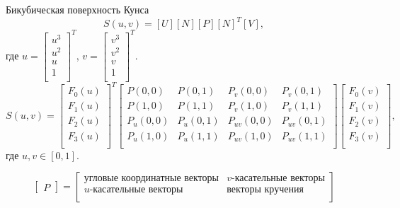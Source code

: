 \documentclass{beamer}
\begin{document}
	\begin{frame}{Бикубическая поверхность Кунса}
		\[
			S(u,v) = [U][N][P][N]^T[V]
			,
		\]
		где
		$ u =
		\begin{bmatrix}
			u^3 \\
			u^2 \\
			u \\
			1 \\
		\end{bmatrix}^T$,
		$ v =
		\begin{bmatrix}
			v^3 \\
			v^2 \\
			v \\
			1 \\
		\end{bmatrix}^T
		$.
		\[
			S(u,v) = 
			\begin{bmatrix}
				F_0(u) \\
				F_1(u) \\
				F_2(u) \\
				F_3(u) \\
			\end{bmatrix}^T
			\begin{bmatrix}
				P(0,0) & P(0,1) & P_v(0,0) & P_v(0,1) \\
				P(1,0) & P(1,1) & P_v(1,0) & P_v(1,1) \\
				P_u(0,0) & P_u(0,1) & P_{uv}(0,0) & P_{uv}(0,1) \\
				P_u(1,0) & P_u(1,1) & P_{uv}(1,0) & P_{uv}(1,1) \\
			\end{bmatrix}
			\begin{bmatrix}
				F_0(v) \\
				F_1(v) \\
				F_2(v) \\
				F_3(v) \\
			\end{bmatrix}
			,
		\]
		где $u,v \in [0,1]$.

		\[
			\begin{bmatrix}
				P
			\end{bmatrix}
			=
			\begin{bmatrix}
				\text{угловые координатные векторы} & v\text{-касательные векторы} \\
				u\text{-касательные векторы} & \text{векторы кручения} \\
			\end{bmatrix}
			\]


\end{frame}
\end{document}
